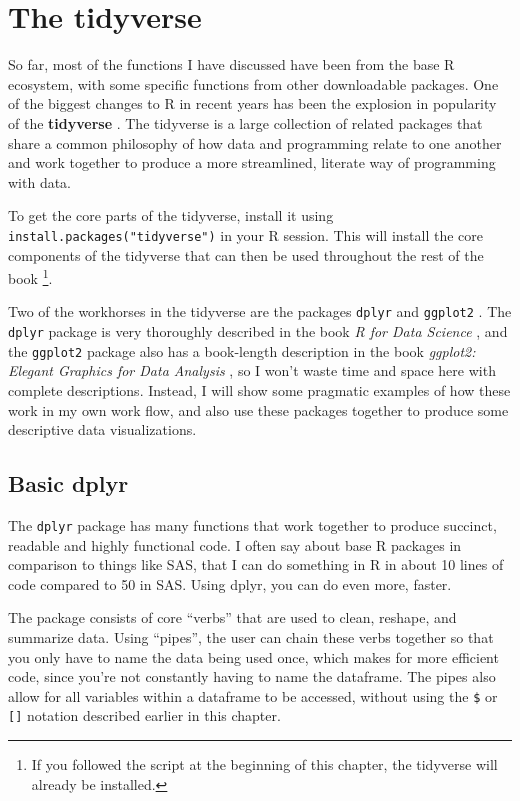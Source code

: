 \documentclass[
]{book}
\begin{document}
\hypertarget{the-tidyverse}{%
\section{The tidyverse}\label{the-tidyverse}}

So far, most of the functions I have discussed have been from the base R
ecosystem, with some specific functions from other downloadable
packages. One of the biggest changes to R in recent years has been the
explosion in popularity of the \textbf{tidyverse} \citet{tidyverse}. The tidyverse
is a large collection of related packages that share a common philosophy
of how data and programming relate to one another and work together to
produce a more streamlined, literate way of programming with data.

To get the core parts of the tidyverse, install it using
\texttt{install.packages("tidyverse")} in your R session. This will install the
core components of the tidyverse that can then be used throughout the
rest of the book \footnote{If you followed the script at the beginning of this
  chapter, the tidyverse will already be installed.}.

Two of the workhorses in the tidyverse are the packages \texttt{dplyr} \citet{dplyr}
and \texttt{ggplot2} \citet{ggplot2}. The \texttt{dplyr} package is very thoroughly described
in the book \emph{R for Data Science} \citet{Wickham2017R}, and the \texttt{ggplot2}
package also has a book-length description in the book \emph{ggplot2: Elegant
Graphics for Data Analysis} \citet{ggplot2}, so I won't waste time and space
here with complete descriptions. Instead, I will show some pragmatic
examples of how these work in my own work flow, and also use these
packages together to produce some descriptive data visualizations.

\hypertarget{basic-dplyr}{%
\subsection{Basic dplyr}\label{basic-dplyr}}

The \texttt{dplyr} package has many functions that work together to produce
succinct, readable and highly functional code. I often say about base R
packages in comparison to things like SAS, that I can do something in R
in about 10 lines of code compared to 50 in SAS. Using dplyr, you can do
even more, faster.

The package consists of core ``verbs'' that are used to clean, reshape,
and summarize data. Using ``pipes'', the user can chain these verbs
together so that you only have to name the data being used once, which
makes for more efficient code, since you're not constantly having to
name the dataframe. The pipes also allow for all variables within a
dataframe to be accessed, without using the \texttt{\$} or \texttt{{[}{]}} notation
described earlier in this chapter.
\end{document}
